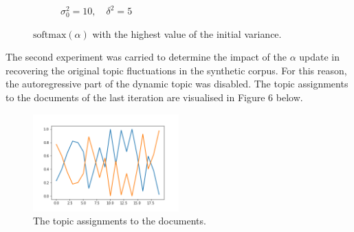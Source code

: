 \documentclass[12pt]{article}
\begin{document}
\begin{figure}[H]
\begin{subfigure}[b]{0.33\textwidth}
                \caption{$\sigma^2_0=10,\quad \delta^2=5$}
                \label{fig:tiger}
        \end{subfigure}
        \caption{$\mbox{softmax}(\alpha)$ with the highest value of the initial variance.}\label{fig:animals}
\end{figure}


\par The second experiment was carried to determine the impact of the $\alpha$ update in recovering the original topic fluctuations in the synthetic corpus. For this reason, the autoregressive part of the dynamic topic was disabled. The topic assignments to the documents of the last iteration are visualised in Figure 6 below.

\begin{figure}[H]
  \centering
  \includegraphics[width=0.5\textwidth]{thetas}
  \caption{The topic assignments to the documents.}
  \label{fig:mu}
\end{figure}




%
\end{document}
